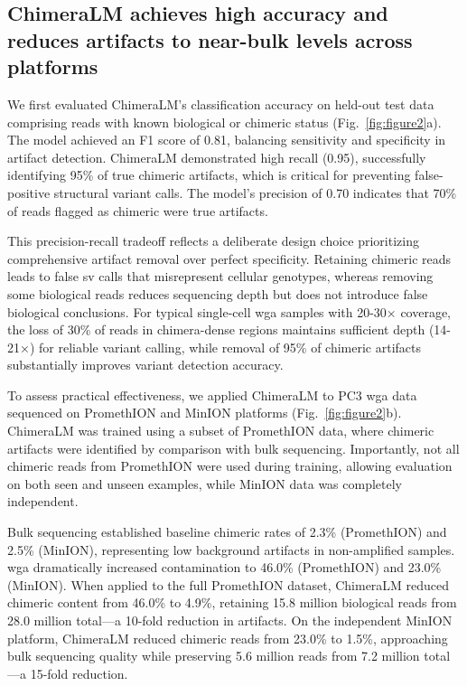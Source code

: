 \documentclass[pdflatex,sn-nature,lineno]{sn-jnl}%
\theoremstyle{thmstyleone}%
\theoremstyle{thmstyletwo}%
\theoremstyle{thmstylethree}%
\begin{document}
\subsection*{ChimeraLM achieves high accuracy and reduces artifacts to near-bulk levels across platforms}

We first evaluated ChimeraLM's classification accuracy on held-out test data comprising reads with known biological or chimeric status (Fig.~\ref{fig:figure2}a).
The model achieved an F1 score of 0.81, balancing sensitivity and specificity in artifact detection.
ChimeraLM demonstrated high recall (0.95), successfully identifying 95\% of true chimeric artifacts, which is critical for preventing false-positive structural variant calls.
The model's precision of 0.70 indicates that 70\% of reads flagged as chimeric were true artifacts.

This precision-recall tradeoff reflects a deliberate design choice prioritizing comprehensive artifact removal over perfect specificity.
Retaining chimeric reads leads to false \gls{sv} calls that misrepresent cellular genotypes, whereas removing some biological reads reduces sequencing depth but does not introduce false biological conclusions.
For typical single-cell \gls{wga} samples with 20-30× coverage, the loss of 30\% of reads in chimera-dense regions maintains sufficient depth (14-21×) for reliable variant calling, while removal of 95\% of chimeric artifacts substantially improves variant detection accuracy.

To assess practical effectiveness, we applied ChimeraLM to PC3 \gls{wga} data sequenced on PromethION and MinION platforms (Fig.~\ref{fig:figure2}b).
ChimeraLM was trained using a subset of PromethION data, where chimeric artifacts were identified by comparison with bulk sequencing.
Importantly, not all chimeric reads from PromethION were used during training, allowing evaluation on both seen and unseen examples, while MinION data was completely independent.

Bulk sequencing established baseline chimeric rates of 2.3\% (PromethION) and 2.5\% (MinION), representing low background artifacts in non-amplified samples. 
\gls{wga} dramatically increased contamination to 46.0\% (PromethION) and 23.0\% (MinION).
When applied to the full PromethION dataset, ChimeraLM reduced chimeric content from 46.0\% to 4.9\%, retaining 15.8 million biological reads from 28.0 million total—a 10-fold reduction in artifacts.
On the independent MinION platform, ChimeraLM reduced chimeric reads from 23.0\% to 1.5\%, approaching bulk sequencing quality while preserving 5.6 million reads from 7.2 million total—a 15-fold reduction.
\end{document}
